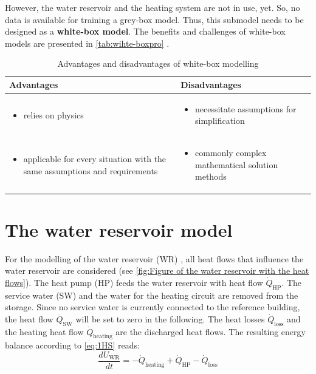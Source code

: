     \newline
    However, the water reservoir and the heating system are not in use, yet. So, no data is available for training a grey-box model. Thus, this submodel needs to be designed as a \textbf{white-box model}.
    \newline
    The benefits and challenges of white-box models are presented in \autoref{tab:wihte-boxpro} \cite{EstradaFlores.2006}.
    \begin{table}[h!]
        \centering
        \begin{tabular}{p{7.3cm} | p{7.3cm}}
        \hline
          Advantages  &  Disadvantages\\
        \hline
        \begin{itemize}
            \item relies on physics
        \end{itemize}
      & \begin{itemize}
            \item necessitate assumptions for simplification
        \end{itemize}\\
     \begin{itemize}
            \item applicable for every situation with the same assumptions and requirements 
        \end{itemize} & \begin{itemize}
            \item commonly complex mathematical solution methods
        \end{itemize}\\
        \end{tabular}
        \caption {Advantages and disadvantages of white-box modelling}
        \label{tab:wihte-boxpro}
    \end{table}

    \section{The water reservoir model}
    \label{waterModel}
    For the modelling of the water reservoir (WR) , all heat flows that influence the water reservoir are considered (see \autoref{fig:Figure of the water reservoir with the heat flows}). The heat pump (HP)  feeds the water reservoir with heat flow $\dot{Q}_\text{HP}$. The service water (SW)  and the water for the heating circuit are removed from the storage. Since no service water is currently connected to the reference building, the heat flow $\dot{Q}_\text{SW}$ will be set to zero in the following. The heat losses $\dot{Q}_\text{loss}$ and the heating heat flow  $\dot{Q}_\text{heating}$ are the discharged heat flows. The resulting energy balance according to \autoref{eq:1HS} reads:
    \begin{equation}
        \label{waterReservoir}
        \frac{d U_\text{WR}}{d t}= -\dot{Q}_\text{heating} + \dot{Q}_\text{HP} - \dot{Q}_\text{loss}
    \end{equation}
    
